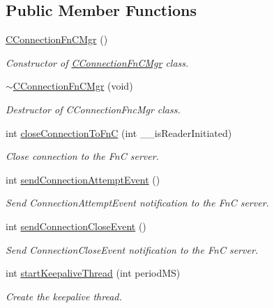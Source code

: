 \subsection*{Public Member Functions}
\begin{DoxyCompactItemize}
\item 
\hyperlink{class_e_l_f_i_n_1_1_c_connection_fn_c_mgr_a59be0f0430708f38db8876fad91ed523}{C\-Connection\-Fn\-C\-Mgr} ()
\begin{DoxyCompactList}\small\item\em Constructor of \hyperlink{class_e_l_f_i_n_1_1_c_connection_fn_c_mgr}{C\-Connection\-Fn\-C\-Mgr} class. \end{DoxyCompactList}\item 
\hyperlink{class_e_l_f_i_n_1_1_c_connection_fn_c_mgr_a1237e5c2eac852fd12bc3547b11bcd99}{$\sim$\-C\-Connection\-Fn\-C\-Mgr} (void)
\begin{DoxyCompactList}\small\item\em Destructor of C\-Connection\-Fnc\-Mgr class. \end{DoxyCompactList}\item 
int \hyperlink{class_e_l_f_i_n_1_1_c_connection_fn_c_mgr_ad1f332c28661f74ea58f7dfa4131fdad}{close\-Connection\-To\-Fn\-C} (int \-\_\-\-\_\-is\-Reader\-Initiated)
\begin{DoxyCompactList}\small\item\em Close connection to the Fn\-C server. \end{DoxyCompactList}\item 
int \hyperlink{class_e_l_f_i_n_1_1_c_connection_fn_c_mgr_af7ee83a8a9546bae5c1f83c4f282d56a}{send\-Connection\-Attempt\-Event} ()
\begin{DoxyCompactList}\small\item\em Send Connection\-Attempt\-Event notification to the Fn\-C server. \end{DoxyCompactList}\item 
int \hyperlink{class_e_l_f_i_n_1_1_c_connection_fn_c_mgr_a0b5e1d5ffe5b49aef3b52254d443ffef}{send\-Connection\-Close\-Event} ()
\begin{DoxyCompactList}\small\item\em Send Connection\-Close\-Event notification to the Fn\-C server. \end{DoxyCompactList}\item 
int \hyperlink{class_e_l_f_i_n_1_1_c_connection_fn_c_mgr_a0c54ce49b3d0c1219f30b89a77062493}{start\-Keepalive\-Thread} (int period\-M\-S)
\begin{DoxyCompactList}\small\item\em Create the keepalive thread. \end{DoxyCompactList}\item 

\end{DoxyCompactItemize}
